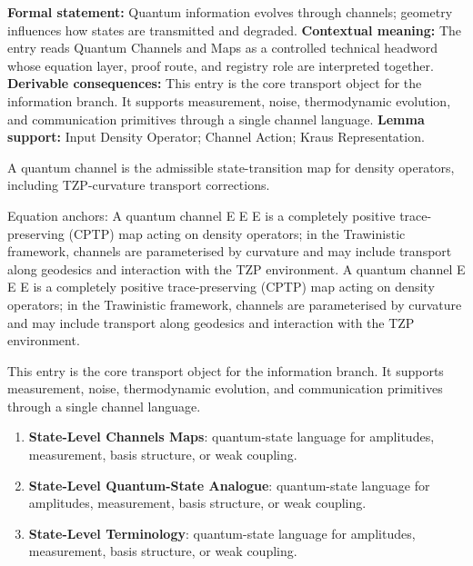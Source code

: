 \begingroup\footnotesize\setlength{\emergencystretch}{3em}\sloppy
\textbf{Formal statement:} Quantum information evolves through channels; geometry influences how states are transmitted and degraded. \textbf{Contextual meaning:} The entry reads Quantum Channels and Maps as a controlled technical headword whose equation layer, proof route, and registry role are interpreted together. \textbf{Derivable consequences:} This entry is the core transport object for the information branch. It supports measurement, noise, thermodynamic evolution, and communication primitives through a single channel language. \textbf{Lemma support:} Input Density Operator; Channel Action; Kraus Representation.\par
\endgroup

A quantum channel is the admissible state-transition map for density operators, including TZP-curvature transport corrections.

Equation anchors: A quantum channel E E E is a completely positive trace-preserving (CPTP) map acting on density operators; in the Trawinistic framework, channels are parameterised by curvature and may include transport along geodesics and interaction with the TZP environment. A quantum channel E E E is a completely positive trace-preserving (CPTP) map acting on density operators; in the Trawinistic framework, channels are parameterised by curvature and may include transport along geodesics and interaction with the TZP environment.

This entry is the core transport object for the information branch. It supports measurement, noise, thermodynamic evolution, and communication primitives through a single channel language.
\endgroup

\begingroup\footnotesize\sloppy
\begin{enumerate}[leftmargin=1.35em,itemsep=1pt,topsep=1pt,parsep=0pt]
\item \textbf{State-Level Channels Maps}: quantum-state language for amplitudes, measurement, basis structure, or weak coupling.
\item \textbf{State-Level Quantum-State Analogue}: quantum-state language for amplitudes, measurement, basis structure, or weak coupling.
\item \textbf{State-Level Terminology}: quantum-state language for amplitudes, measurement, basis structure, or weak coupling.
\end{enumerate}
\endgroup


